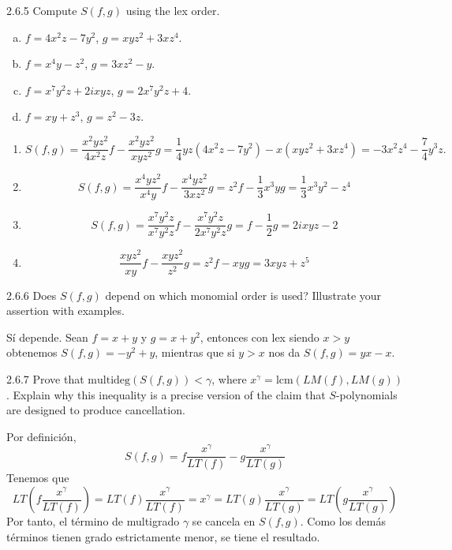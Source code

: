 \documentclass[twoside]{article}
\begin{document}
\begin{ejercicio}{2.6.5}
Compute $S( f , g)$ using the lex order.
\begin{enumerate}[a.]
\item $f = 4x^2z − 7y^2$, $g = xyz^2 + 3xz^4$.
\item $f = x^4y − z^2$, $g = 3xz^2 − y$.
\item $f = x^7y^2z + 2ixyz$, $g = 2x^7y^2z + 4$.
\item $f = xy + z^3$, $g = z^2 − 3z$.
\end{enumerate}
\end{ejercicio}
\begin{solucion}\mbox{}
\begin{enumerate}
\item \[ S(f,g) = \frac{x^2yz^2}{4x^2z}f - \frac{x^2yz^2}{xyz^2}g = \frac{1}{4}yz(4x^2z-7y^2)-x(xyz^2+3xz^4) =  -3x^2z^4 - \frac{7}{4}y^3z. \]
\item \[ S(f,g) = \frac{x^4yz^2}{x^4y}f - \frac{x^4yz^2}{3xz^2}g = z^2f-\frac{1}{3}x^3yg = \frac{1}{3}x^3y^2-z^4 \]
\item \[ S(f,g) = \frac{x^7y^2z}{x^7y^2z}f-\frac{x^7y^2z}{2x^7y^2z}g = f- \frac{1}{2}g = 2ixyz-2\]
\item \[ \frac{xyz^2}{xy}f-\frac{xyz^2}{z^2}g = z^2f-xyg = 3xyz+z^5 \]
\end{enumerate}
\end{solucion}

\newpage

\begin{ejercicio}{2.6.6}
Does $S( f , g)$ depend on which monomial order is used? Illustrate your assertion with
examples.
\end{ejercicio}
\begin{solucion}
Sí depende. Sean $f=x+y$ y $g=x+y^2$, entonces con lex siendo $x>y$ obtenemos $S(f,g)=-y^2+y$, mientras que si $y>x$ nos da $S(f,g)=yx-x$.
\end{solucion}

\newpage

\begin{ejercicio}{2.6.7}
Prove that $\mathrm{multideg}(S( f , g)) < γ$, where $x^γ = \mathrm{lcm}(LM( f ), LM(g))$. Explain why this
inequality is a precise version of the claim that $S$-polynomials are designed to produce
cancellation.
\end{ejercicio}
\begin{solucion}
Por definición, $$S(f,g)=f\frac{x^{\gamma}}{LT(f)}-g\frac{x^{\gamma}}{LT(g)}$$ 
Tenemos que $$LT\left(f\frac{x^{\gamma}}{LT(f)}\right)=LT(f)\frac{x^{\gamma}}{LT(f)}=x^{\gamma}=LT(g)\frac{x^{\gamma}}{LT(g)}=LT\left(g\frac{x^{\gamma}}{LT(g)}\right)$$
Por tanto, el término de multigrado $\gamma$ se cancela en $S(f,g)$. Como los demás términos tienen grado estrictamente menor, se tiene el resultado.
\end{solucion}
\end{document}
